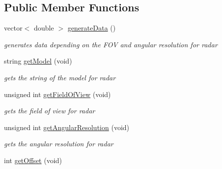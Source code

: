 \subsection*{Public Member Functions}
\begin{DoxyCompactItemize}
\item 
vector$<$ double $>$ \hyperlink{classRadar_a45ac8b0ad39dd402706e52733c8d372f}{generate\+Data} ()\hypertarget{classRadar_a45ac8b0ad39dd402706e52733c8d372f}{}\label{classRadar_a45ac8b0ad39dd402706e52733c8d372f}

\begin{DoxyCompactList}\small\item\em generates data depending on the F\+OV and angular resolution for radar \end{DoxyCompactList}\item 
string \hyperlink{classRadar_a95997166ffc91d1af644b0dcf2b7a80c}{get\+Model} (void)\hypertarget{classRadar_a95997166ffc91d1af644b0dcf2b7a80c}{}\label{classRadar_a95997166ffc91d1af644b0dcf2b7a80c}

\begin{DoxyCompactList}\small\item\em gets the string of the model for radar \end{DoxyCompactList}\item 
unsigned int \hyperlink{classRadar_a775fbd0f15b61d51d071f4e9c0305113}{get\+Field\+Of\+View} (void)\hypertarget{classRadar_a775fbd0f15b61d51d071f4e9c0305113}{}\label{classRadar_a775fbd0f15b61d51d071f4e9c0305113}

\begin{DoxyCompactList}\small\item\em gets the field of view for radar \end{DoxyCompactList}\item 
unsigned int \hyperlink{classRadar_a8253881e17e63ef80945b2c472189c9d}{get\+Angular\+Resolution} (void)\hypertarget{classRadar_a8253881e17e63ef80945b2c472189c9d}{}\label{classRadar_a8253881e17e63ef80945b2c472189c9d}

\begin{DoxyCompactList}\small\item\em gets the angular resolution for radar \end{DoxyCompactList}\item 
int \hyperlink{classRadar_adb5af48c1858d3d3e064cb104ad04890}{get\+Offset} (void)\hypertarget{classRadar_adb5af48c1858d3d3e064cb104ad04890}{}\label{classRadar_adb5af48c1858d3d3e064cb104ad04890}


\end{DoxyCompactItemize}
